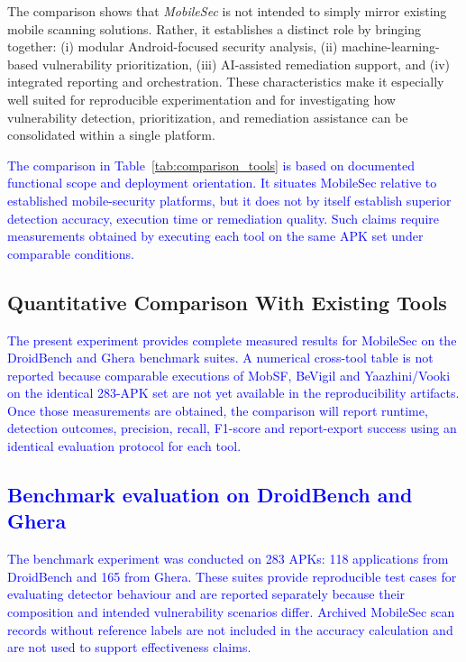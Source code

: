 \documentclass[preprint,12pt, a4paper]{elsarticle}
\begin{document}
The comparison shows that \textit{MobileSec} is not intended to simply mirror existing mobile scanning solutions. Rather, it establishes a distinct role by bringing together: (i) modular Android-focused security analysis, (ii) machine-learning-based vulnerability prioritization, (iii) AI-assisted remediation support, and (iv) integrated reporting and orchestration. These characteristics make it especially well suited for reproducible experimentation and for investigating how vulnerability detection, prioritization, and remediation assistance can be consolidated within a single platform.

\textcolor{blue}{The comparison in Table~\ref{tab:comparison_tools} is based on documented functional scope and deployment orientation. It situates MobileSec relative to established mobile-security platforms, but it does not by itself establish superior detection accuracy, execution time or remediation quality. Such claims require measurements obtained by executing each tool on the same APK set under comparable conditions.}

\subsection{Quantitative Comparison With Existing Tools}

\textcolor{blue}{The present experiment provides complete measured results for MobileSec on the DroidBench and Ghera benchmark suites. A numerical cross-tool table is not reported because comparable executions of MobSF, BeVigil and Yaazhini/Vooki on the identical 283-APK set are not yet available in the reproducibility artifacts. Once those measurements are obtained, the comparison will report runtime, detection outcomes, precision, recall, F1-score and report-export success using an identical evaluation protocol for each tool.}

\subsection{\textcolor{blue}{Benchmark evaluation on DroidBench and Ghera}}

\textcolor{blue}{The benchmark experiment was conducted on 283 APKs: 118 applications from DroidBench and 165 from Ghera. These suites provide reproducible test cases for evaluating detector behaviour and are reported separately because their composition and intended vulnerability scenarios differ. Archived MobileSec scan records without reference labels are not included in the accuracy calculation and are not used to support effectiveness claims.}
\end{document}
